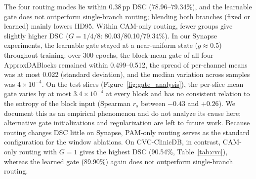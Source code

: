 The four routing modes lie within 0.38\,pp DSC (78.96--79.34\%), and the learnable gate does not outperform single-branch routing; blending both branches (fixed or learned) mainly lowers HD95. Within CAM-only routing, fewer groups give slightly higher DSC ($G{=}1/4/8$: 80.03/80.10/79.34\%). In our Synapse experiments, the learnable gate stayed at a near-uniform state ($g \approx 0.5$) throughout training: over 300 epochs, the block-mean gate of all four ApproxDABlocks remained within 0.499--0.512, the spread of per-channel means was at most 0.022 (standard deviation), and the median variation across samples was $4{\times}10^{-4}$. On the test slices (Figure~\ref{fig:gate_analysis}), the per-slice mean gate varies by at most $3.4{\times}10^{-4}$ at every block and has no consistent relation to the entropy of the block input (Spearman $r_s$ between $-0.43$ and $+0.26$). We document this as an empirical phenomenon and do not analyze its cause here; alternative gate initializations and regularization are left to future work. Because routing changes DSC little on Synapse, PAM-only routing serves as the standard configuration for the window ablations. On CVC-ClinicDB, in contrast, CAM-only routing with $G{=}1$ gives the highest DSC (90.54\%, Table~\ref{tab:cvc}), whereas the learned gate (89.90\%) again does not outperform single-branch routing.
